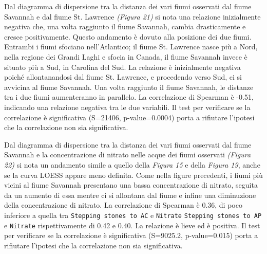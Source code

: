 \documentclass{article} %
\begin{document}
Dal diagramma di dispersione tra la distanza dei vari fiumi osservati dal fiume Savannah e dal fiume St. Lawrence \textit{(Figura 21)} si nota una relazione inizialmente negativa che, una volta raggiunto il fiume Savannah, cambia drasticamente e cresce positivamente. 
Questo andamento è dovuto alla posizione dei due fiumi. Entrambi i fiumi sfociano nell'Atlantico; il fiume St. Lawrence nasce più a Nord, nella regione dei Grandi Laghi e sfocia in Canada, il fiume Savannah invece è situato più a Sud, in Carolina del Sud. La relazione è inizialmente negativa poiché allontanandosi dal fiume St. Lawrence, e procedendo verso Sud, ci si avvicina al fiume Savannah. Una volta raggiunto il fiume Savannah, le distanze tra i due fiumi aumenteranno in parallelo.
La correlazione di Spearman è -0.51, indicando una relazione negativa tra le due variabili.  
Il test per verificare se la correlazione è significativa (S=21406, p-value=0.0004) porta a rifiutare l'ipotesi che la correlazione non sia significativa.

Dal diagramma di dispersione tra la distanza dei vari fiumi osservati dal fiume Savannah e la concentrazione di nitrato nelle acque dei fiumi osservati \textit{(Figura 22)} si nota un andamento simile a quello della \textit{Figura 15} e della \textit{Figura 19}, anche se la curva LOESS appare meno definita. 
Come nella figure precedenti, i fiumi più vicini al fiume Savannah presentano una bassa concentrazione di nitrato, seguita da un aumento di essa mentre ci si allontana dal fiume e infine una diminuzione della concentrazione di nitrato.
La correlazione di Spearman è 0.36, di poco inferiore a quella tra \texttt{Stepping stones to AC} e \texttt{Nitrate} \texttt{Stepping stones to AP} e \texttt{Nitrate} rispettivamente di 0.42 e 0.40. La relazione è lieve ed è positiva. 
Il test per verificare se la correlazione è significativa (S=9025.2, p-value=0.015) porta a rifiutare l'ipotesi che la correlazione non sia significativa.
\end{document}
